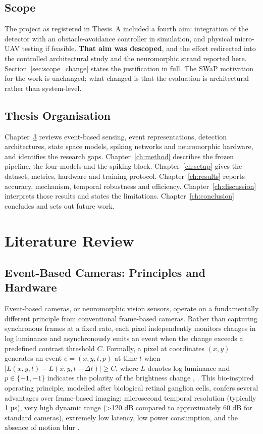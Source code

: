 \documentclass[11pt, a4paper]{report}
\begin{document}
\section{Scope}
\label{sec:scope}
The project as registered in Thesis~A included a fourth aim: integration of the detector with an
obstacle-avoidance controller in simulation, and physical micro-UAV testing if feasible. \textbf{That
aim was descoped}, and the effort redirected into the controlled architectural study and the
neuromorphic strand reported here. Section~\ref{sec:scope_change} states the justification in full.
The SWaP motivation for the work is unchanged; what changed is that the evaluation is architectural
rather than system-level.

\section{Thesis Organisation}
\label{sec:organisation}
Chapter~\ref{ch:lit} reviews event-based sensing, event representations, detection architectures,
state space models, spiking networks and neuromorphic hardware, and identifies the research gaps.
Chapter~\ref{ch:method} describes the frozen pipeline, the four models and the spiking block.
Chapter~\ref{ch:setup} gives the dataset, metrics, hardware and training protocol.
Chapter~\ref{ch:results} reports accuracy, mechanism, temporal robustness and efficiency.
Chapter~\ref{ch:discussion} interprets those results and states the limitations.
Chapter~\ref{ch:conclusion} concludes and sets out future work.

\chapter{Literature Review}
\label{ch:lit}

\section{Event-Based Cameras: Principles and Hardware}
Event-based cameras, or neuromorphic vision sensors, operate on a fundamentally different principle from conventional frame-based cameras. Rather than capturing synchronous frames at a fixed rate, each pixel independently monitors changes in log luminance and asynchronously emits an event when the change exceeds a predefined contrast threshold $C$. Formally, a pixel at coordinates $(x, y)$ generates an event $e = (x, y, t, p)$ at time $t$ when $|L(x, y, t) - L(x, y, t - \Delta t)| \geq C$, where $L$ denotes log luminance and $p \in \{+1, -1\}$ indicates the polarity of the brightness change \cite{gallego2020event}, \cite{lichtsteiner2008128x128}. This bio-inspired operating principle, modelled after biological retinal ganglion cells, confers several advantages over frame-based imaging: microsecond temporal resolution (typically 1 µs), very high dynamic range (>120 dB compared to approximately 60 dB for standard cameras), extremely low latency, low power consumption, and the absence of motion blur \cite{gallego2020event}.
\end{document}
